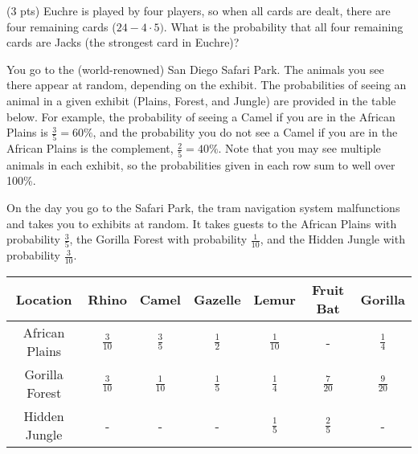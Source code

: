 \documentclass[twoside,12pt]{article}
\begin{document}
\begin{probset}
\begin{prob}[(12 pts)]
\begin{subprobset}
    
    \begin{subprob}(3 pts)
        Euchre is played by four players, so when all cards are dealt, there are four remaining cards ($24 - 4\cdot 5)$. What is the probability that all four remaining cards are Jacks (the strongest card in Euchre)?

        \begin{responsebox}{0.9in}
            
        \end{responsebox}
    \end{subprob}

    
\end{subprobset}
\end{prob}

\newpage \begin{prob}[(11 pts)]
    You go to the (world-renowned) San Diego Safari Park. The animals you see there appear at random, depending on the exhibit. The probabilities of seeing an animal in a given exhibit (Plains, Forest, and Jungle) are provided in the table below. For example, the probability of seeing a Camel if you are in the African Plains is $\frac{3}{5} = 60\%$, and the probability you do not see a Camel if you are in the African Plains is the complement, $\frac{2}{5} = 40\%$. Note that you may see multiple animals in each exhibit, so the probabilities given in each row sum to well over 100\%.

    On the day you go to the Safari Park, the tram navigation system malfunctions and takes you to exhibits at random. It takes guests to the African Plains with probability $\frac{3}{5}$, the Gorilla Forest with probability $\frac{1}{10}$, and the Hidden Jungle with probability $\frac{3}{10}$. 

\begin{table}[h!]
    \centering
    \renewcommand{\arraystretch}{1.6}
    \begin{tabular}{|c|c|c|c|c|c|c|}
        \hline
        \textbf{Location} & \textbf{Rhino} & \textbf{Camel} & \textbf{Gazelle} & \textbf{Lemur}  & \textbf{Fruit Bat}  & \textbf{Gorilla} \\ \hline
        African Plains  & \(\frac{3}{10}\) & \(\frac{3}{5}\) & \(\frac{1}{2}\) & \(\frac{1}{10}\) &  -       & \(\frac{1}{4}\)    \\ \hline
        Gorilla Forest & \(\frac{3}{10}\) & \(\frac{1}{10}\)    & \(\frac{1}{5}\)  & \(\frac{1}{4}\) & \(\frac{7}{20}\)  & \(\frac{9}{20}\) \\ \hline
        Hidden Jungle  & -    & -    & -    & \(\frac{1}{5}\) &  \(\frac{2}{5}\)   & -    \\ \hline
    \end{tabular}    %
    \label{tab:animal_probs_transposed}
\end{table}


\end{prob}
\end{probset}
\end{document}
